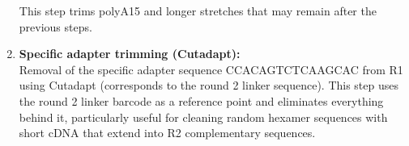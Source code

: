 \documentclass[
  11pt,
  a4paper,
]{report}
\newenvironment{Shaded}{\begin{snugshade}}{\end{snugshade}}
\newcommand{\AttributeTok}[1]{\textcolor[rgb]{0.40,0.45,0.13}{#1}}
\newcommand{\DataTypeTok}[1]{\textcolor[rgb]{0.68,0.00,0.00}{#1}}
\newcommand{\ExtensionTok}[1]{\textcolor[rgb]{0.00,0.23,0.31}{#1}}
\newcommand{\NormalTok}[1]{\textcolor[rgb]{0.00,0.23,0.31}{#1}}
\newcommand{\OperatorTok}[1]{\textcolor[rgb]{0.37,0.37,0.37}{#1}}
\newcommand{\StringTok}[1]{\textcolor[rgb]{0.13,0.47,0.30}{#1}}
\newcommand{\VariableTok}[1]{\textcolor[rgb]{0.07,0.07,0.07}{#1}}
\begin{document}
\begin{enumerate}
\begin{Shaded}
\end{Shaded}

  This step trims polyA15 and longer stretches that may remain after the
  previous steps.
\item
  \textbf{Specific adapter trimming (Cutadapt):}\\
  Removal of the specific adapter sequence CCACAGTCTCAAGCAC from R1
  using Cutadapt (corresponds to the round 2 linker sequence). This step
  uses the round 2 linker barcode as a reference point and eliminates
  everything behind it, particularly useful for cleaning random hexamer
  sequences with short cDNA that extend into R2 complementary sequences.


\end{enumerate}
\end{document}
